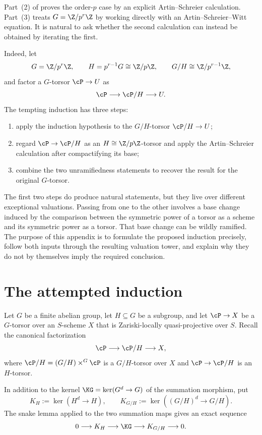 Part~(2) of  proves the order-$p$
case by an explicit Artin--Schreier calculation. Part~(3) treats
$G=\Z/p^r\Z$ by working directly with an Artin--Schreier--Witt equation.
It is natural to ask whether the second calculation can instead be obtained
by iterating the first.

Indeed, let
\[
G=\Z/p^r\Z,\qquad
H=p^{r-1}G\cong\Z/p\Z,\qquad
G/H\cong\Z/p^{r-1}\Z,
\]
and factor a $G$-torsor $\cP\to U$ as
\[
\cP\longrightarrow\cP/H\longrightarrow U.
\]
The tempting induction has three steps:
\begin{enumerate}
  \item apply the induction hypothesis to the $G/H$-torsor
        $\cP/H\to U$;
  \item regard $\cP\to\cP/H$ as an $H\cong\Z/p\Z$-torsor and apply the
        Artin--Schreier calculation after compactifying its base;
  \item combine the two unramifiedness statements to recover the result for
        the original $G$-torsor.
\end{enumerate}

The first two steps do produce natural statements, but they live over
different exceptional valuations. Passing from one to the other involves a
base change induced by the comparison between the symmetric power of a
torsor as a scheme and its symmetric power as a torsor. That base change can
be wildly ramified. The purpose of this appendix is to formulate the proposed
induction precisely, follow both inputs through the resulting valuation
tower, and explain why they do not by themselves imply the required
conclusion.


\section{The attempted induction}
\label{sec:as_induction_preliminaries}

Let $G$ be a finite abelian group, let $H\subseteq G$ be a subgroup, and let
$\cP\to X$ be a $G$-torsor over an $S$-scheme $X$ that is Zariski-locally
quasi-projective over $S$. Recall the canonical factorization
\[
\cP\longrightarrow\cP/H\longrightarrow X,
\]
where $\cP/H=(G/H)\times^G\cP$ is a $G/H$-torsor over $X$ and
$\cP\to\cP/H$ is an $H$-torsor.

In addition to the kernel $\KG=\ker(G^d\to G)$ of the summation morphism,
put
\[
K_H:=\ker(H^d\to H),\qquad
K_{G/H}:=\ker((G/H)^d\to G/H).
\]
The snake lemma applied to the two summation maps gives an exact sequence
\begin{equation}\label{eq:summation_kernels_ses}
0\longrightarrow K_H\longrightarrow\KG\longrightarrow K_{G/H}
\longrightarrow0.
\end{equation}

